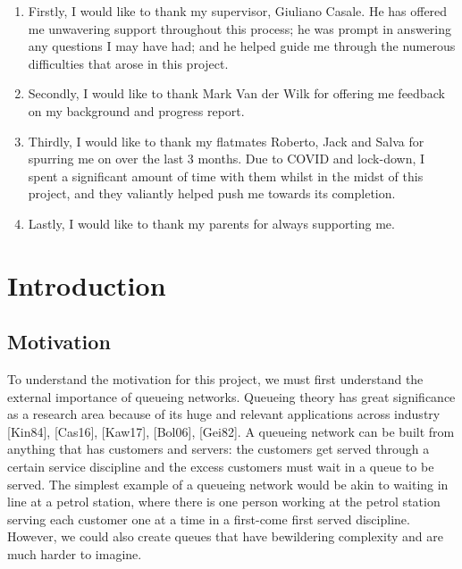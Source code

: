 \documentclass[a4paper,11pt,titlepage]{article}
\begin{document}
\begin{enumerate}
    \item Firstly, I would like to thank my supervisor, Giuliano Casale. He has offered me unwavering support throughout this process; he was prompt in answering any questions I may have had; and he helped guide me through the numerous difficulties that arose in this project. 
    \item Secondly, I would like to thank Mark Van der Wilk for offering me feedback on my background and progress report. 
    \item Thirdly, I would like to thank my flatmates Roberto, Jack and Salva for spurring me on over the last 3 months. Due to COVID and lock-down, I spent a significant amount of time with them whilst in the midst of this project, and they valiantly helped push me towards its completion.
    \item Lastly, I would like to thank my parents for always supporting me.
\end{enumerate}

\clearpage

\tableofcontents

\clearpage

\section{Introduction}

\subsection{Motivation}

To understand the motivation for this project, we must first understand the external importance of queueing networks. Queueing theory has great significance as a research area because of its huge and relevant applications across industry [Kin84], [Cas16], [Kaw17], [Bol06], [Gei82]. A queueing network can be built from anything that has customers and servers: the customers get served through a certain service discipline and the excess customers must wait in a queue to be served. The simplest example of a queueing network would be akin to waiting in line at a petrol station, where there is one person working at the petrol station serving each customer one at a time in a first-come first served discipline. However, we could also create queues that have bewildering complexity and are much harder to imagine. \\
\end{document}
